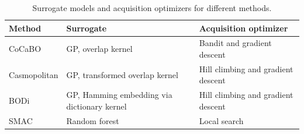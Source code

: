 
\begin{table}[htbp]
  \centering
  \caption{Surrogate models and acquisition optimizers for different methods.}
  \label{tab:methods-surrogates-optimizers}
  \begin{tabularx}{\textwidth}{@{}lXX@{}}
    \toprule
    \textbf{Method} & \textbf{Surrogate} & \textbf{Acquisition optimizer} \\
    \midrule
    CoCaBO       & GP, overlap kernel                              & Bandit and gradient descent \\
    Casmopolitan & GP, transformed overlap kernel                  & Hill climbing and gradient descent \\
    BODi         & GP, Hamming embedding via dictionary kernel     & Hill climbing and gradient descent \\
    SMAC         & Random forest                                   & Local search \\
    \bottomrule
  \end{tabularx}
\end{table}
